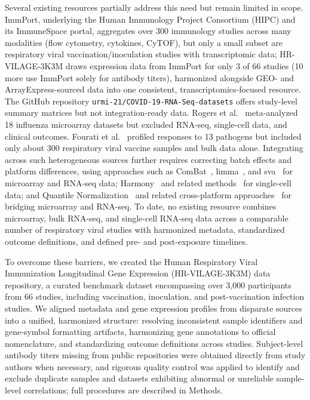 \documentclass[
  12pt]{article}
\begin{document}
Several existing resources partially address this need but remain limited in scope. ImmPort, underlying the Human Immunology Project Consortium (HIPC) and its ImmuneSpace portal, aggregates over 300 immunology studies across many modalities (flow cytometry, cytokines, CyTOF), but only a small subset are respiratory viral vaccination/inoculation studies with transcriptomic data; HR-VILAGE-3K3M draws expression data from ImmPort for only 3 of 66 studies (10 more use ImmPort solely for antibody titers), harmonized alongside GEO- and ArrayExpress-sourced data into one consistent, transcriptomics-focused resource. The GitHub repository \texttt{urmi-21/COVID-19-RNA-Seq-datasets} offers study-level summary matrices but not integration-ready data. Rogers et al.~\citep{rogers2019} meta-analyzed 18 influenza microarray datasets but excluded RNA-seq, single-cell data, and clinical outcomes. Fourati et al.~\citep{fourati2022} profiled responses to 13 pathogens but included only about 300 respiratory viral vaccine samples and bulk data alone. Integrating across such heterogeneous sources further requires correcting batch effects and platform differences, using approaches such as ComBat~\citep{wang2017combat}, limma~\citep{ritchie2015limma}, and sva~\citep{leek2012sva} for microarray and RNA-seq data; Harmony~\citep{korsunsky2019harmony} and related methods~\citep{stuart2019comprehensive,haghverdi2018mnn} for single-cell data; and Quantile Normalization~\citep{bolstad2003} and related cross-platform approaches~\citep{thompson2015,tang2021rankin,Sun2026CrossPlatform} for bridging microarray and RNA-seq. To date, no existing resource combines microarray, bulk RNA-seq, and single-cell RNA-seq data across a comparable number of respiratory viral studies with harmonized metadata, standardized outcome definitions, and defined pre- and post-exposure timelines.

To overcome these barriers, we created the Human Respiratory Viral Immunization Longitudinal Gene Expression (HR-VILAGE-3K3M) data repository, a curated benchmark dataset encompassing over 3,000 participants from 66 studies, including vaccination, inoculation, and post-vaccination infection studies. We aligned metadata and gene expression profiles from disparate sources into a unified, harmonized structure: resolving inconsistent sample identifiers and gene-symbol formatting artifacts, harmonizing gene annotations to official nomenclature, and standardizing outcome definitions across studies. Subject-level antibody titers missing from public repositories were obtained directly from study authors when necessary, and rigorous quality control was applied to identify and exclude duplicate samples and datasets exhibiting abnormal or unreliable sample-level correlations; full procedures are described in Methods.
\end{document}
